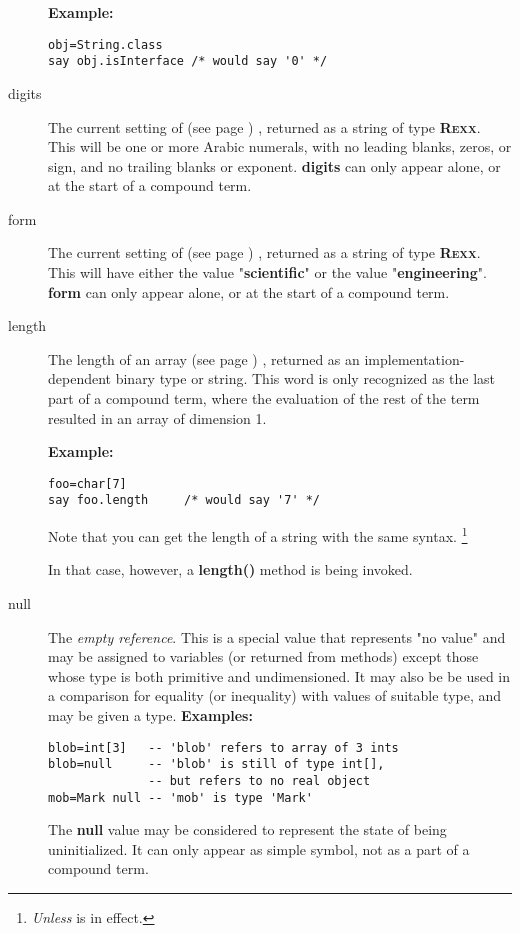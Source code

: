 \begin{description}
\textbf{Example:}
\begin{lstlisting}
obj=String.class
say obj.isInterface /* would say '0' */
\end{lstlisting}
\item[digits]\label{refswdigit}
 The current setting of   (see page \pageref{refndigits}) ,
returned as a string of type \textbf{R\textsc{exx}}.
This will be one or more Arabic numerals, with no leading blanks, zeros,
or sign, and no trailing blanks or exponent.
 \textbf{digits} can only appear alone, or at the start of a
compound term.
\item[form]\label{refswform}
 The current setting of   (see page \pageref{refnform}) ,
returned as a string of type \textbf{R\textsc{exx}}.
This will have either the value "\textbf{scientific}" or the
value "\textbf{engineering}".
 \textbf{form} can only appear alone, or at the start of a
compound term.
\item[length]\label{refswleng}
 The length of an  array (see page \pageref{refarray}) , returned as an
implementation-dependent binary type or string.
This word is only recognized as the last part of a compound term,
where the evaluation of the rest of the term resulted in an array of
dimension 1.
 
\textbf{Example:}
\begin{lstlisting}
foo=char[7]
say foo.length     /* would say '7' */
\end{lstlisting}
 
Note that you can get the length of a \nr{} string with the
same syntax.
\footnote{\emph{Unless } is in effect.}

In that case, however, a \textbf{length()} method is being invoked.
\item[null]\label{refswnull}
 
The \emph{empty reference}.  This is a special value that represents
"no value" and may be assigned to variables (or returned from
methods) except those whose type is both primitive and undimensioned.
It may also be be used in a comparison for equality (or inequality) with
values of suitable type, and may be given a type.
 \textbf{Examples:}
\begin{lstlisting}
blob=int[3]   -- 'blob' refers to array of 3 ints
blob=null     -- 'blob' is still of type int[],
              -- but refers to no real object
mob=Mark null -- 'mob' is type 'Mark'
\end{lstlisting}
 The \textbf{null} value may be considered to represent the state of
being uninitialized.  It can only appear as simple symbol, not as a part
of a compound term.


\end{description}
